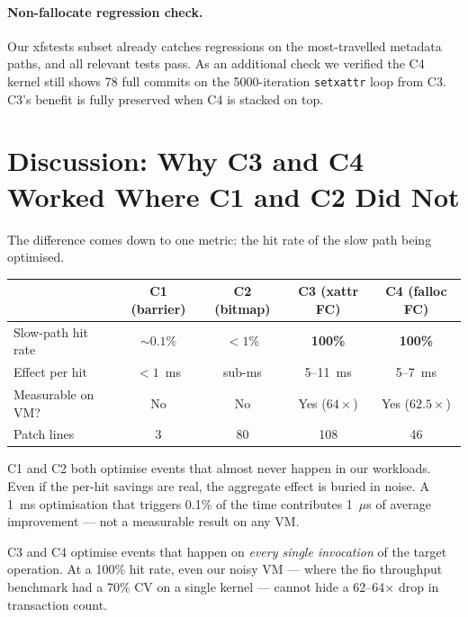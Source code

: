 \documentclass[12pt,a4paper]{article}
\begin{document}
\paragraph{Non-fallocate regression check.}
Our xfstests subset already catches regressions on the most-travelled
metadata paths, and all relevant tests pass.  As an additional
check we verified the C4 kernel still shows 78 full commits on
the 5000-iteration \texttt{setxattr} loop from C3.  C3's benefit
is fully preserved when C4 is stacked on top.

\section{Discussion: Why C3 and C4 Worked Where C1 and C2 Did Not}

The difference comes down to one metric: the hit rate of the slow
path being optimised.

\begin{center}
\small
\begin{tabular}{lcccc}
\toprule
 & \textbf{C1 (barrier)} & \textbf{C2 (bitmap)} & \textbf{C3 (xattr FC)} & \textbf{C4 (falloc FC)} \\
\midrule
Slow-path hit rate   & ${\sim}0.1\%$ & ${<}1\%$  & \textbf{100\%}   & \textbf{100\%}  \\
Effect per hit       & ${<}1$~ms     & sub-ms    & 5--11~ms          & 5--7~ms         \\
Measurable on VM?    & No            & No        & Yes ($64{\times}$) & Yes ($62.5{\times}$) \\
Patch lines          & 3             & 80        & 108               & 46              \\
\bottomrule
\end{tabular}
\end{center}

C1 and C2 both optimise events that almost never happen in our
workloads.  Even if the per-hit savings are real, the aggregate
effect is buried in noise.  A 1~ms optimisation that triggers
0.1\% of the time contributes 1~$\mu$s of average improvement ---
not a measurable result on any VM.

C3 and C4 optimise events that happen on \emph{every single
invocation} of the target operation.  At a 100\% hit rate, even
our noisy VM --- where the fio throughput benchmark had a 70\% CV
on a single kernel --- cannot hide a 62--64$\times$ drop in
transaction count.
\end{document}

